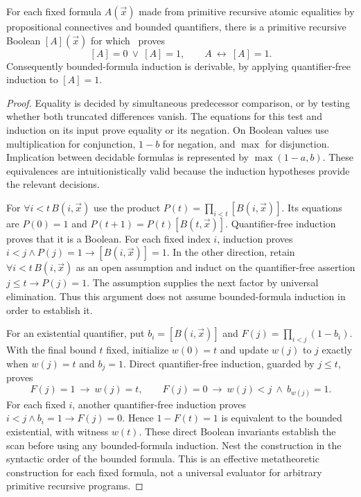 \begin{lemma}\label{fd:reflection}
For each fixed formula $A(\vec x)$ made from primitive recursive atomic equalities by propositional connectives and bounded quantifiers, there is a primitive recursive Boolean $[A](\vec x)$ for which \ipra\ proves
\[
 [A]=0\ \vee\ [A]=1,
 \qquad A\ \longleftrightarrow\ [A]=1.
\]
Consequently bounded-formula induction is derivable, by applying quantifier-free induction to $[A]=1$.
\end{lemma}
\begin{proof}
Equality is decided by simultaneous predecessor comparison, or by testing whether both truncated differences vanish. The equations for this test and induction on its input prove equality or its negation. On Boolean values use multiplication for conjunction, $1-b$ for negation, and $\max$ for disjunction. Implication between decidable formulas is represented by $\max(1-a,b)$. These equivalences are intuitionistically valid because the induction hypotheses provide the relevant decisions.

For $\forall i<t\,B(i,\vec x)$ use the product $P(t)=\prod_{i<t}[B(i,\vec x)]$. Its equations are $P(0)=1$ and $P(t+1)=P(t)[B(t,\vec x)]$. Quantifier-free induction proves that it is a Boolean. For each fixed index $i$, induction proves $i<j\wedge P(j)=1\to[B(i,\vec x)]=1$. In the other direction, retain $\forall i<t\,B(i,\vec x)$ as an open assumption and induct on the quantifier-free assertion $j\le t\to P(j)=1$. The assumption supplies the next factor by universal elimination. Thus this argument does not assume bounded-formula induction in order to establish it.

For an existential quantifier, put $b_i=[B(i,\vec x)]$ and $F(j)=\prod_{i<j}(1-b_i)$. With the final bound $t$ fixed, initialize $w(0)=t$ and update $w(j)$ to $j$ exactly when $w(j)=t$ and $b_j=1$. Direct quantifier-free induction, guarded by $j\le t$, proves
\[
 F(j)=1\ \longrightarrow\ w(j)=t,\qquad
 F(j)=0\ \longrightarrow\ w(j)<j\ \wedge\ b_{w(j)}=1.
\]
For each fixed $i$, another quantifier-free induction proves $i<j\wedge b_i=1\to F(j)=0$. Hence $1-F(t)=1$ is equivalent to the bounded existential, with witness $w(t)$. These direct Boolean invariants establish the scan before using any bounded-formula induction. Nest the construction in the syntactic order of the bounded formula. This is an effective metatheoretic construction for each fixed formula, not a universal evaluator for arbitrary primitive recursive programs.
\end{proof}

